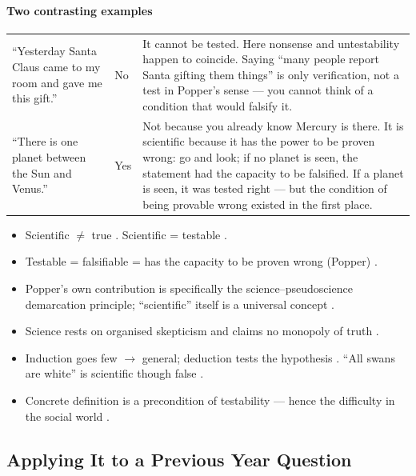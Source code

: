 \paragraph{Two contrasting examples}
\begin{table}[h!]
\centering
\begin{tabularx}{\textwidth}{lYY}
\toprule
{}
 &  &  \\
\midrule
``Yesterday Santa Claus came to my room and gave me this gift.'' & No & It cannot be tested. Here nonsense and untestability happen to coincide. Saying ``many people report Santa gifting them things'' is only verification, not a test in Popper's sense --- you cannot think of a condition that would falsify it. \\
``There is one planet between the Sun and Venus.'' & Yes & Not because you already know Mercury is there. It is scientific because it has the power to be proven wrong: go and look; if no planet is seen, the statement had the capacity to be falsified. If a planet is seen, it was tested right --- but the condition of being provable wrong existed in the first place. \\
\bottomrule
\end{tabularx}
\end{table}

\begin{QuickRevision}
\begin{itemize}
    \item Scientific $\neq$ true . Scientific = testable .
    \item Testable = falsifiable = has the capacity to be proven wrong (Popper) .
    \item Popper's own contribution is specifically the science--pseudoscience demarcation principle; ``scientific'' itself is a universal concept .
    \item Science rests on organised skepticism and claims no monopoly of truth .
    \item Induction goes few $\rightarrow$ general; deduction tests the hypothesis . ``All swans are white'' is scientific though false .
    \item Concrete definition is a precondition of testability --- hence the difficulty in the social world .
\end{itemize}
\end{QuickRevision}

\subsection{Applying It to a Previous Year Question}

